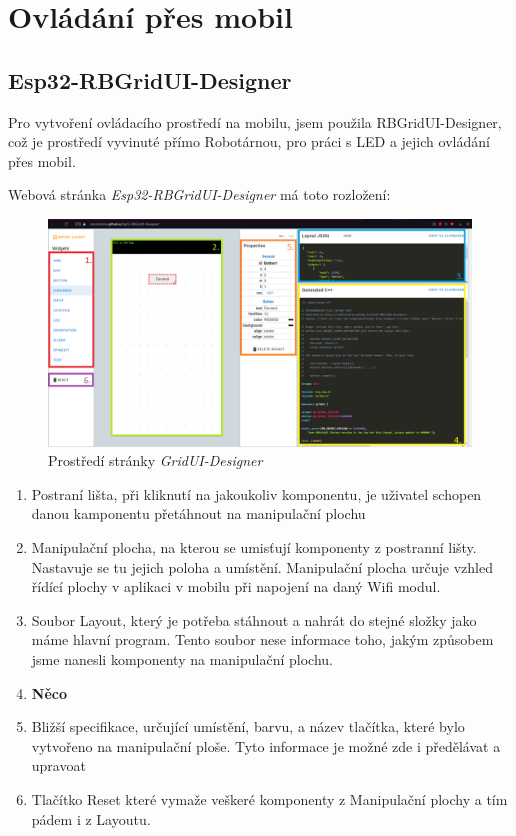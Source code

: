 \chapter{Ovládání přes mobil}

\section{Esp32-RBGridUI-Designer} 
Pro vytvoření ovládacího prostředí na mobilu, jsem použila {RBGridUI-Designer}, \cite{RBGridUI-Designer} což je prostředí vyvinuté přímo Robotárnou,\cite{robotarna} pro práci s LED a jejich ovládání přes mobil.

Webová stránka {\em Esp32-RBGridUI-Designer} má toto rozložení: 

\begin{figure}[htbp]
	\centering
	\includegraphics[width=1\textwidth]{img/Esp32-RBGridUI-Designer.png}
	\caption{Prostředí stránky {\em GridUI-Designer}}
\end{figure}

\begin{enumerate}
	\item Postraní lišta, při kliknutí na jakoukoliv komponentu, je uživatel schopen danou kamponentu přetáhnout na manipulační plochu 
	\item Manipulační plocha, na kterou se umisťují komponenty z postranní lišty. Nastavuje se tu jejich poloha a umístění. Manipulační plocha určuje vzhled řídící plochy v aplikaci v mobilu při napojení na daný Wifi modul. 
	\item Soubor Layout, který je potřeba stáhnout a nahrát do stejné složky jako máme hlavní program. Tento soubor nese informace toho, jakým způsobem jsme nanesli komponenty na manipulační plochu.
	\item  {\bf Něco} %
	\item Bližší specifikace, určující umístění, barvu, a název tlačítka, které bylo vytvořeno na manipulační ploše. Tyto informace je možné zde i předělávat a upravoat 
	\item Tlačítko Reset které vymaže veškeré komponenty z Manipulační plochy a tím pádem i z Layoutu.
\end{enumerate}

